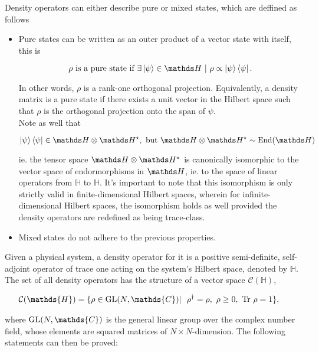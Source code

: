 \documentclass{homework}
\begin{document}
Density operators can either describe pure or mixed states, which are deffined as follows 

\begin{itemize}
    \item Pure states can be written as an outer product of a vector state with itself, this is 
    
    $$
    \rho \textnormal{ is a pure state if } \exists \ket{\psi} \in \hilbert \blanky | \blanky \rho \propto \ket{\psi} \bra{\psi}. 
    $$
    
    In other words, $\rho$ is a rank-one orthogonal projection. Equivalently, a density matrix is a pure state if there exists a unit vector in the Hilbert space such that $\rho$ is the orthogonal projection onto the span of $\psi$. \\
    
    Note as well that 
    
    $$
       \ket{\psi} \bra{\psi} \in \hilbert \otimes \hilbert^{\star}, \textnormal{ but } \hilbert \otimes \hilbert^{\star} \sim \textnormal{End}(\hilbert)
    $$
    
    ie. the tensor space $\hilbert \otimes \hilbert^{\star}$ is canonically isomorphic to the vector space of endormorphisms in $\hilbert$, ie. to the space of linear operators from $\mathds{H}$ to $\mathds{H}$.
    It's important to note that this isomorphism is only strictly valid in finite-dimensional Hilbert spaces, wherein for infinite-dimensional Hilbert spaces, the isomorphism holds as well provided the density operators are redefined as being trace-class.
    \item Mixed states do not adhere to the previous properties. 
\end{itemize}

Given a physical system, a density operator for it is a positive semi-definite, self-adjoint operator of trace one acting on the system's Hilbert space, denoted by $\mathds{H}$. The set of all density operators has the structure of a vector space $\mathcal{C}(\mathds{H})$,

\begin{equation}
\begin{split}
\mathcal{C}(\mathds{H}) = \{ \rho& \in \textnormal{GL}(N, \mathds{C}) | \blanky
\blanky \rho^\dagger = \rho, 
\blanky \rho \geq 0, \blanky \textnormal{Tr } \rho = 1 \},    
\end{split}
\end{equation}

where $\textnormal{GL}(N, \mathds{C})$ is the general linear group over the complex number field, whose elements are squared matrices of $N \times N$-dimension. The following statements can then be proved:
\end{document}
